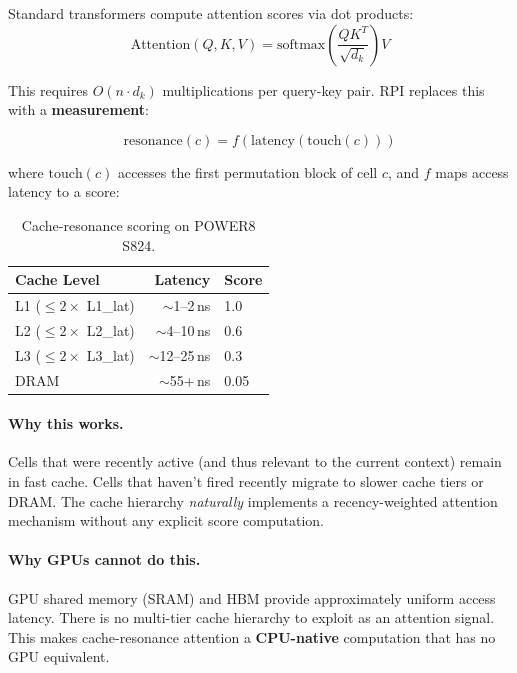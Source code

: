 \documentclass[10pt,twocolumn]{article}
\begin{document}
Standard transformers compute attention scores via dot products:
\begin{equation}
\text{Attention}(Q, K, V) = \text{softmax}\left(\frac{QK^T}{\sqrt{d_k}}\right) V
\end{equation}

This requires $O(n \cdot d_k)$ multiplications per query-key pair. RPI replaces this with a \textbf{measurement}:

\begin{equation}
\text{resonance}(c) = f(\text{latency}(\text{touch}(c)))
\end{equation}

where $\text{touch}(c)$ accesses the first permutation block of cell $c$, and $f$ maps access latency to a score:

\begin{table}[h]
\centering
\small
\begin{tabular}{lrl}
\toprule
\textbf{Cache Level} & \textbf{Latency} & \textbf{Score} \\
\midrule
L1 ($\leq 2\times$ L1\_lat) & $\sim$1--2\,ns & 1.0 \\
L2 ($\leq 2\times$ L2\_lat) & $\sim$4--10\,ns & 0.6 \\
L3 ($\leq 2\times$ L3\_lat) & $\sim$12--25\,ns & 0.3 \\
DRAM & $\sim$55+\,ns & 0.05 \\
\bottomrule
\end{tabular}
\caption{Cache-resonance scoring on POWER8 S824.}
\label{tab:resonance}
\end{table}

\paragraph{Why this works.} Cells that were recently active (and thus relevant to the current context) remain in fast cache. Cells that haven't fired recently migrate to slower cache tiers or DRAM. The cache hierarchy \emph{naturally} implements a recency-weighted attention mechanism without any explicit score computation.

\paragraph{Why GPUs cannot do this.} GPU shared memory (SRAM) and HBM provide approximately uniform access latency. There is no multi-tier cache hierarchy to exploit as an attention signal. This makes cache-resonance attention a \textbf{CPU-native} computation that has no GPU equivalent.
\end{document}
